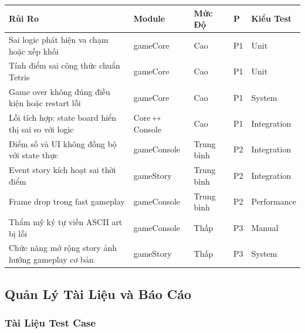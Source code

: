 \documentclass[12pt,a4paper]{article}
\begin{document}
\begin{table}[H]
\centering
{}
\begin{tabularx}{\linewidth}{|X|l|l|l|l|}
\hline
\rowcolor{gray!35}
\textbf{Rủi Ro} & \textbf{Module} & \textbf{Mức Độ} & \textbf{P} & \textbf{Kiểu Test} \\ \hline
Sai logic phát hiện va chạm hoặc xếp khối     & gameCore         & Cao         & P1 & Unit        \\ \hline
Tính điểm sai công thức chuẩn Tetris          & gameCore         & Cao         & P1 & Unit        \\ \hline
Game over không đúng điều kiện hoặc restart lỗi & gameCore       & Cao         & P1 & System      \\ \hline
Lỗi tích hợp: state board hiển thị sai so với logic & Core$\leftrightarrow$Console & Cao & P1 & Integration \\ \hline
Điểm số và UI không đồng bộ với state thực    & gameConsole      & Trung bình  & P2 & Integration \\ \hline
Event story kích hoạt sai thời điểm           & gameStory        & Trung bình  & P2 & Integration \\ \hline
Frame drop trong fast gameplay                & gameConsole      & Trung bình  & P2 & Performance \\ \hline
Thẩm mỹ ký tự viền ASCII art bị lỗi          & gameConsole      & Thấp        & P3 & Manual      \\ \hline
Chức năng mở rộng story ảnh hưởng gameplay cơ bản & gameStory   & Thấp        & P3 & System      \\ \hline
\end{tabularx}
\end{table}

\subsection{Quản Lý Tài Liệu và Báo Cáo}

\subsubsection{Tài Liệu Test Case}
\end{document}
